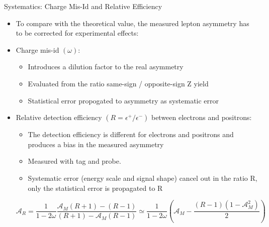 \documentclass[8pt]{beamer}
\begin{document}
\begin{frame}{Systematics: Charge Mis-Id and Relative Efficiency}
  \begin{itemize}
    \item To compare with the theoretical value, the measured lepton asymmetry has to be corrected for experimental effects:
      \item Charge mis-id $(\omega)$: 
      \begin{itemize}
        \item Introduces a dilution factor to the real asymmetry
        \item Evaluated from the ratio same-sign / opposite-sign Z yield
        \item Statistical error propogated to asymmetry as systematic error
      \end{itemize}
      \item Relative detection efficiency $(R = \epsilon^+/\epsilon^-)$ between electrons and positrons: 
      \begin{itemize}
        \item The detection efficiency is different for electrons and positrons and produces a bias in the measured asymmetry
        \item Measured with tag and probe.
        \item Systematic error (energy scale and signal shape) cancel out in the ratio R, only the statistical error is propagated to R
      \end{itemize}
      \begin{center}
      \begin{equation}
        \mathcal{A}_R=
          \frac{1}{1-2\omega}\frac{ \mathcal{A}_M\left(R+1\right) - \left(R-1\right)}{\left(R+1\right)-\mathcal{A}_M \left(R-1\right)}
          \simeq 
          \frac{1}{1-2\omega}\left(\mathcal{A}_M -\frac{\left(R-1\right)\left(1-\mathcal{A}_M^2\right)}{2}\right)
      \end{equation}
      \end{center}
  \end{itemize}
\end{frame}
\end{document}
